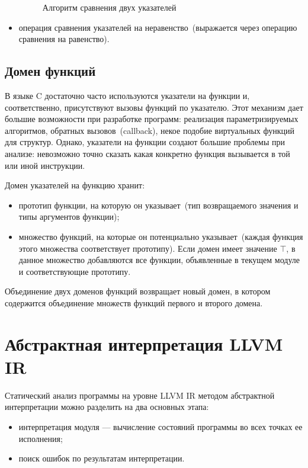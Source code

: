 \begin{itemize}
\begin{figure}[h!]
\begin{algorithmic}[1]
\end{algorithmic}
\caption{Алгоритм сравнения двух указателей}
\label{image:ptrEq}
\end{figure}

\item операция сравнения указателей на неравенство~(выражается через операцию
сравнения на равенство).
\end{itemize}

\subsection{Домен функций}
В языке C достаточно часто используются указатели на функции и, соответственно,
присутствуют вызовы функций по указателю. Этот механизм дает большие 
возможности при разработке программ: реализация параметризируемых алгоритмов, 
обратных вызовов~(callback), некое подобие виртуальных функций для структур. 
Однако, указатели на функции создают большие проблемы при анализе: невозможно 
точно сказать какая конкретно функция вызывается в той или иной инструкции.

Домен указателей на функцию хранит:
\begin{itemize}
\item прототип функции, на которую он указывает~(тип возвращаемого значения
и типы аргументов функции);
\item множество функций, на которые он потенциально указывает~(каждая функция
этого множества соответствует прототипу). Если домен имеет значение $\top$, в
данное множество добавляются все функции, объявленные в текущем модуле и 
соответствующие прототипу.
\end{itemize}

Объединение двух доменов функций возвращает новый домен, в котором содержится
объединение множеств функций первого и второго домена.

\section{Абстрактная интерпретация LLVM IR}
Статический анализ программы на уровне LLVM IR методом абстрактной 
интерпретации можно разделить на два основных этапа:
\begin{itemize}
\item интерпретация модуля --- вычисление состояний программы во всех точках
ее исполнения;
\item поиск ошибок по результатам интерпретации.
\end{itemize}

